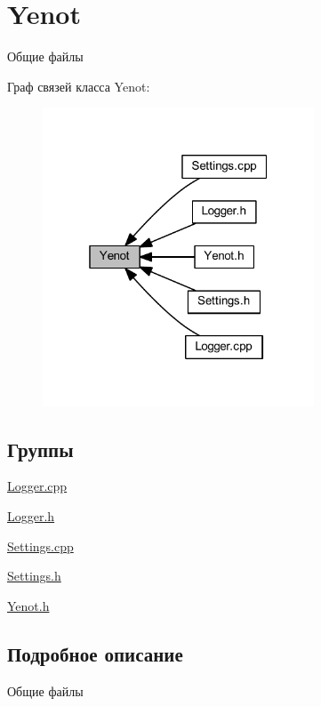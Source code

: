 \hypertarget{group__yenot}{}\section{Yenot}
\label{group__yenot}


Общие файлы  


Граф связей класса Yenot\+:\nopagebreak
\begin{figure}[H]
\begin{center}
\leavevmode
\includegraphics[width=229pt]{group__yenot}
\end{center}
\end{figure}
\subsection*{Группы}
\begin{DoxyCompactItemize}
\item 
\mbox{\hyperlink{group__loggercpp}{Logger.\+cpp}}
\item 
\mbox{\hyperlink{group__loggerh}{Logger.\+h}}
\item 
\mbox{\hyperlink{group__settingscpp}{Settings.\+cpp}}
\item 
\mbox{\hyperlink{group__settingsh}{Settings.\+h}}
\item 
\mbox{\hyperlink{group__yenoth}{Yenot.\+h}}
\end{DoxyCompactItemize}


\subsection{Подробное описание}
Общие файлы 

